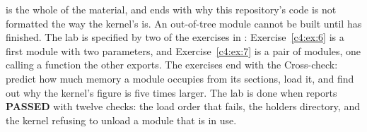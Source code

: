  is the whole of the material, and ends with why this repository's code is not
formatted the way the kernel's is. An out-of-tree module cannot be built until 
has finished. The lab is specified by two of the exercises in :
Exercise~\ref{c4:ex:6} is a first module with two parameters, and Exercise~\ref{c4:ex:7} is a pair
of modules, one calling a function the other exports. The exercises end with the Cross-check:
predict how much memory a module occupies from its sections, load it, and find out why the
kernel's figure is five times larger. The lab is done when  reports
\textbf{PASSED} with twelve checks: the load order that fails, the holders directory, and the
kernel refusing to unload a module that is in use.




